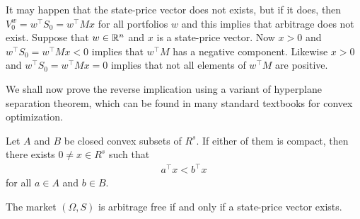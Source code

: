 It may happen that the state-price vector does not exists, but if it does, then $V_0^{w} = w^{\top} S_0 = w^{\top} Mx$ for all portfolios $w$ and this implies that arbitrage does not exist. Suppose that $w \in \mathbb{R}^n$ and $x$ is a state-price vector. Now $x > 0$ and $w^{\top} S_0 = w^{\top} Mx < 0$ implies that $w^{\top} M$ has a negative component. Likewise $x > 0$ and $w^{\top} S_0 = w^{\top} Mx = 0$ implies that not all elements of $w^{\top} M$ are positive.

We shall now prove the reverse implication using a variant of hyperplane separation theorem, which can be found in many standard textbooks for convex optimization.

\begin{thm}
Let $A$ and $B$ be closed convex subsets of $R^s$. If either of them is compact, then there exists $0 \not = x \in R^s$ such that
  \begin{align}
    a^{\top} x < b^{\top} x
  \end{align}
for all $a \in A$ and $b \in B$.
\end{thm}

\begin{lemma}
\label{discreteonetimefirstfundamentallemma}
The market $(\Omega, S)$ is arbitrage free if and only if a state-price vector exists.
\end{lemma}

